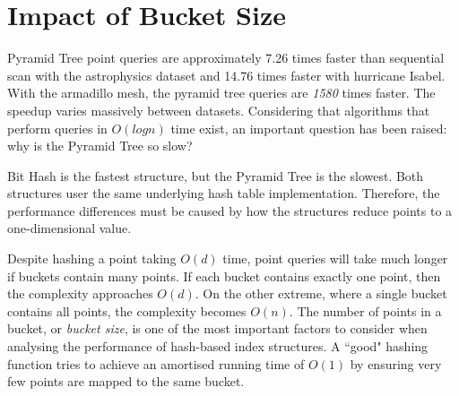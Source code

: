 \section{Impact of Bucket Size}

Pyramid Tree point queries are approximately 7.26 times faster than sequential scan with the astrophysics dataset and 14.76 times faster with hurricane Isabel. With the armadillo mesh, the pyramid tree queries are \textit{1580} times faster. The speedup varies massively between datasets. Considering that algorithms that perform queries in $O(log n)$ time exist, an important question has been raised: why is the Pyramid Tree so slow?

Bit Hash is the fastest structure, but the Pyramid Tree is the slowest. Both structures user the same underlying hash table implementation. Therefore, the performance differences must be caused by how the structures reduce points to a one-dimensional value. 

Despite hashing a point taking $O(d)$ time, point queries will take much longer if buckets contain many points. If each bucket contains exactly one point, then the complexity approaches $O(d)$. On the other extreme, where a single bucket contains all points, the complexity becomes $O(n)$. The number of points in a bucket, or \textit{bucket size}, is one of the most important factors to consider when analysing the performance of hash-based index structures. A ``good" hashing function tries to achieve an amortised running time of $O(1)$ by ensuring very few points are mapped to the same bucket.

